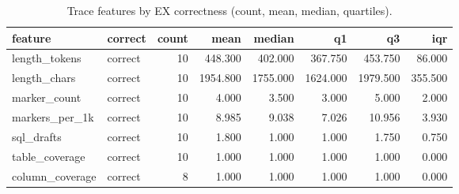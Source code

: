 \begin{table}[htbp]
\caption{Trace features by EX correctness (count, mean, median, quartiles).}
\label{tab:task2_desc_by_correctness}
\begin{tabular}{llrrrrrr}
\toprule
feature & correct & count & mean & median & q1 & q3 & iqr \\
\midrule
length_tokens & correct & 10 & 448.300 & 402.000 & 367.750 & 453.750 & 86.000 \\
length_chars & correct & 10 & 1954.800 & 1755.000 & 1624.000 & 1979.500 & 355.500 \\
marker_count & correct & 10 & 4.000 & 3.500 & 3.000 & 5.000 & 2.000 \\
markers_per_1k & correct & 10 & 8.985 & 9.038 & 7.026 & 10.956 & 3.930 \\
sql_drafts & correct & 10 & 1.800 & 1.000 & 1.000 & 1.750 & 0.750 \\
table_coverage & correct & 10 & 1.000 & 1.000 & 1.000 & 1.000 & 0.000 \\
column_coverage & correct & 8 & 1.000 & 1.000 & 1.000 & 1.000 & 0.000 \\
\bottomrule
\end{tabular}
\end{table}
